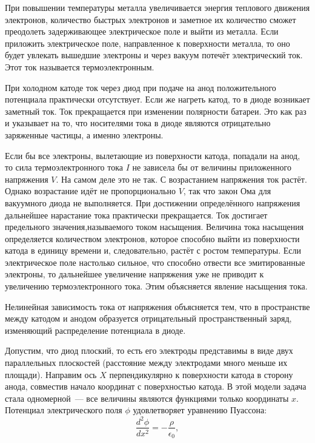 \documentclass[a4paper,10pt,twoside]{article}
\begin{document}
При повышении температуры металла увеличивается энергия теплового движения электронов, количество быстрых электронов и заметное их количество сможет преодолеть задерживающее электрическое поле и выйти из металла. Если приложить
электрическое поле, направленное к поверхности металла, то оно будет увлекать вышедшие электроны и через вакуум потечёт электрический ток. Этот ток называется {\textsf{термоэлектронным}}.

При холодном катоде ток через диод при подаче на анод положительного потенциала практически отсутствует. Если же нагреть катод, то в диоде возникает заметный ток. Ток прекращается при изменении полярности батареи. Это как раз и указывает на то, что носителями тока в диоде являются отрицательно заряженные частицы, а именно электроны.

Если бы все электроны, вылетающие из поверхности катода, попадали на анод, то сила термоэлектронного тока $I$ не
зависела бы от величины приложенного напряжения $V$. На самом деле это не так. С возрастанием напряжения ток растёт.
Однако возрастание идёт не пропорционально $V$, так что закон Ома для вакуумного диода не выполняется. При достижении определённого напряжения дальнейшее нарастание тока практически прекращается. Ток достигает предельного значения,называемого током насыщения. Величина тока насыщения определяется количеством электронов, которое способно выйти из поверхности катода в единицу времени и, следовательно, растёт с ростом температуры. Если электрическое поле настолько сильное, что способно отвести все эмитированные электроны, то дальнейшее увеличение напряжения уже не приводит к увеличению термоэлектронного тока. Этим объясняется явление насыщения тока.

Нелинейная зависимость тока от напряжения объясняется тем, что в пространстве между катодом и анодом образуется
отрицательный пространственный заряд, изменяющий распределение потенциала в диоде.

Допустим, что диод плоский, то есть его электроды представимы в виде двух параллельных плоскостей (расстояние между
электродами много меньше их площади). Направим ось $X$ перпендикулярно к поверхности катода в сторону анода, совместив начало координат с поверхностью катода. В этой модели задача стала одномерной~--- все величины являются функциями только координаты $x$. Потенциал электрического поля $\phi$ удовлетворяет уравнению Пуассона:
\begin{equation}
\frac{d^2\phi}{dx^2}=-\frac{\rho}{\epsilon_0},
\end{equation}
\end{document}
